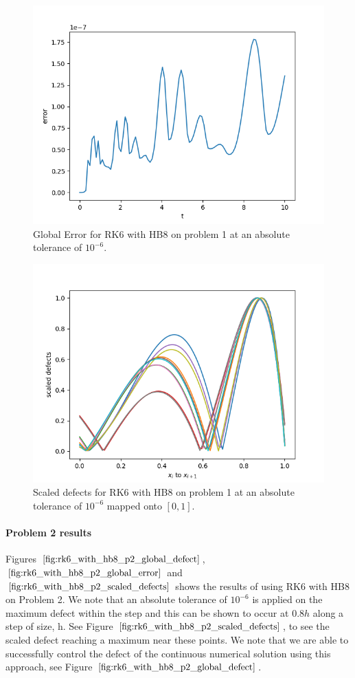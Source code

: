 \begin{figure}[H]
\centering
\includegraphics[width=0.7\linewidth]{./figures/rk6_with_hb8_p1_global_error}
\caption{Global Error for RK6 with HB8 on problem 1 at an absolute tolerance of $10^{-6}$.}
\label{fig:rk6_with_hb8_p1_global_error}
\end{figure}

\begin{figure}[H]
\centering
\includegraphics[width=0.7\linewidth]{./figures/rk6_with_hb8_p1_scaled_defects}
\caption{Scaled defects for RK6 with HB8 on problem 1 at an absolute tolerance of $10^{-6}$ mapped onto $[0, 1]$.}
\label{fig:rk6_with_hb8_p1_scaled_defects}
\end{figure}

\paragraph{Problem 2 results}
Figures $\ref{fig:rk6_with_hb8_p2_global_defect}$, $\ref{fig:rk6_with_hb8_p2_global_error}$ and $\ref{fig:rk6_with_hb8_p2_scaled_defects}$ shows the results of using RK6 with HB8 on Problem 2. We note that an absolute tolerance of $10^{-6}$ is applied on the maximum defect within the step and this can be shown to occur at $0.8h$ along a step of size, h. See Figure $\ref{fig:rk6_with_hb8_p2_scaled_defects}$, to see the scaled defect reaching a maximum near these points. We note that we are able to successfully control the defect of the continuous numerical solution using this approach, see Figure $\ref{fig:rk6_with_hb8_p2_global_defect}$. 


